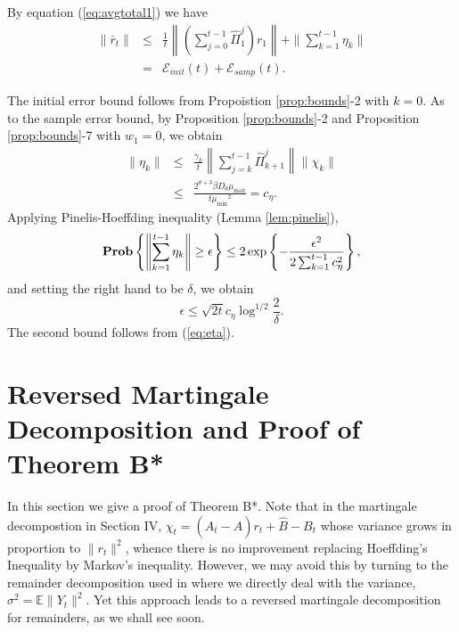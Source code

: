 \documentclass[twoside,twocolumn,journal]{IEEEtran}
\newenvironment{pf}[1][Proof]{\medskip\noindent\hspace{1em}{\itshape #1: }}{\hspace*{\fill}~\QED\par\endtrivlist\medskip}
\def\E{{\mathbb E}}        %
\def\Err{{\mathscr E}}
\def\Prob{{\bf Prob}}
\def\amax{{\mu_{\max}}}
\def\amin{{\mu_{\min}} }
\begin{document}
\begin{pf}[Proof of Theorem 3.2] By equation (\ref{eq:avgtotal1}) we have
\begin{eqnarray*}
\|\bar{r}_{t}\| & \leq & \frac{1}{t}\left\|\left(\sum_{j=0}^{t-1} \hat{\Pi}_1^j \right) r_1\right\| + \|\sum_{k=1}^{t-1}\eta_k\| \\
& = & \Err_{init}(t) + \Err_{samp}(t).
\end{eqnarray*}

The initial error bound follows from Propoistion \ref{prop:bounds}-2 with $k=0$.
As to the sample error bound, by Proposition \ref{prop:bounds}-2 and Proposition \ref{prop:bounds}-7 with $w_1=0$, we obtain
\begin{eqnarray}
\|\eta_k\| & \leq & \frac{\gamma_k}{t} \left\| \sum_{j=k}^{t-1} \hat{\Pi}_{k+1}^j \right\| \|\chi_k\| \nonumber \\
& \leq & \frac{2^{\theta+3} \beta D_\theta \amax}{t \amin^2} = c_\eta. \label{eq:eta}
\end{eqnarray}
Applying Pinelis-Hoeffding inequality (Lemma \ref{lem:pinelis}),
\[ \Prob \left\{ \left\|\sum_{k=1}^{t-1} \eta_k \right\| \geq \epsilon \right\} \leq
2 \exp \left\{-\frac{\epsilon^2}{2\sum_{k=1}^{t-1} c_\eta^2} \right\},  \]
and setting the right hand to be $\delta$, we obtain
\[ \epsilon \leq  \sqrt{2t} c_\eta \log^{1/2} \frac{2}{\delta}.\]
The second bound follows from (\ref{eq:eta}).
\end{pf}


\section{Reversed Martingale Decomposition and Proof of Theorem B*}


In this section we give a proof of Theorem B*. Note that in the martingale decompostion in Section IV,
$\chi_t=(A_t - \hat{A})r_t + \hat{B}-B_t$ whose variance grows in proportion to $\|r_t\|^2$, whence there is no improvement
replacing Hoeffding's Inequality by Markov's inequality.
However, we may avoid this by turning to the remainder decomposition used in \cite{SmaYao04} where we directly deal with the variance,
$\sigma^2=\E\|Y_t\|^2$. Yet this approach leads to a reversed martingale decomposition for remainders, as we shall see soon.
\end{document}
